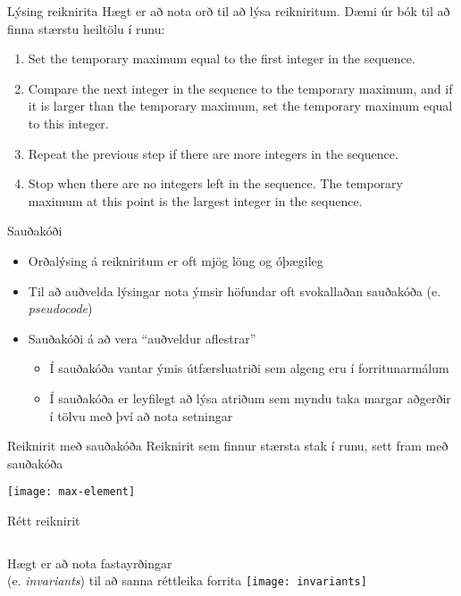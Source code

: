 \documentclass{beamer}
\begin{document}
\begin{frame}{Lýsing reiknirita}
Hægt er að nota orð til að lýsa reikniritum. Dæmi úr bók til að finna stærstu heiltölu í runu:

\begin{enumerate}
 \item Set the temporary maximum equal to the first integer in the sequence.
 \item Compare the next integer in the sequence to the temporary maximum, and if it is larger
than the temporary maximum, set the temporary maximum equal to this integer.
 \item Repeat the previous step if there are more integers in the sequence.
 \item Stop when there are no integers left in the sequence. The temporary maximum at this
point is the largest integer in the sequence.
\end{enumerate}
\end{frame}

\begin{frame}{Sauðakóði}
\begin{itemize}
 \item Orðalýsing á reikniritum er oft mjög löng og óþægileg
 \item Til að auðvelda lýsingar nota ýmsir höfundar oft svokallaðan sauðakóða (e. \emph{pseudocode})
 \item Sauðakóði á að vera ``auðveldur aflestrar''
 \begin{itemize}
  \item Í sauðakóða vantar ýmis útfærsluatriði sem algeng eru í forritunarmálum
  \item Í sauðakóða er leyfilegt að lýsa atriðum sem myndu taka margar aðgerðir í tölvu með því að nota setningar
 \end{itemize}
\end{itemize}
\end{frame}

\begin{frame}{Reiknirit með sauðakóða}
Reiknirit sem finnur stærsta stak í runu, sett fram með sauðakóða

\texttt{[image: max-element]}
\end{frame}


\begin{frame}{Rétt reiknirit}
\begin{columns}
Hægt er að nota fastayrðingar\\
(e. \emph{invariants}) til að sanna réttleika forrita
\texttt{[image: invariants]}
\end{columns}
\end{frame}
\end{document}
